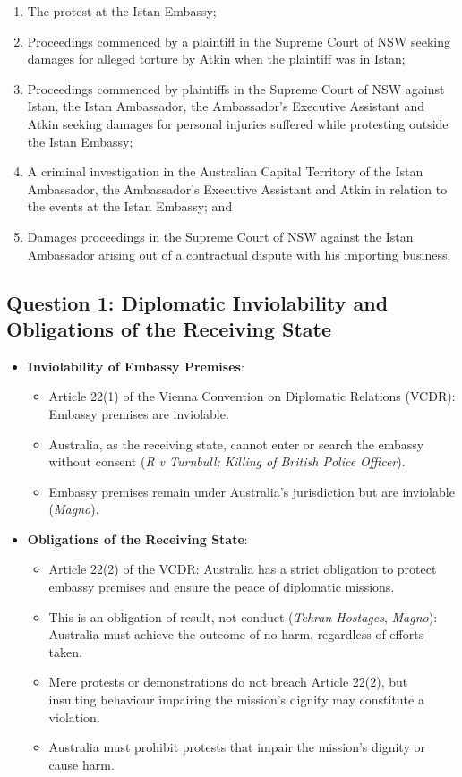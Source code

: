 \begin{tutorialquestion}
    \begin{enumerate}
        \item The protest at the Istan Embassy;
        \item Proceedings commenced by a plaintiff in the Supreme Court of NSW seeking damages for alleged torture by Atkin when the plaintiff was in Istan;
        \item Proceedings commenced by plaintiffs in the Supreme Court of NSW against Istan, the Istan Ambassador, the Ambassador’s Executive Assistant and Atkin seeking damages for personal injuries suffered while protesting outside the Istan Embassy;
        \item A criminal investigation in the Australian Capital Territory of the Istan Ambassador, the Ambassador's Executive Assistant and Atkin in relation to the events at the Istan Embassy; and
        \item Damages proceedings in the Supreme Court of NSW against the Istan Ambassador arising out of a contractual dispute with his importing business.
    \end{enumerate}
\end{tutorialquestion}

\subsection{Question 1: Diplomatic Inviolability and Obligations of the Receiving State}
\begin{itemize}
    \item \textbf{Inviolability of Embassy Premises}:
    \begin{itemize}
        \item Article 22(1) of the Vienna Convention on Diplomatic Relations (VCDR): Embassy premises are inviolable.
        \item Australia, as the receiving state, cannot enter or search the embassy without consent (\textit{R v Turnbull; Killing of British Police Officer}).
        \item Embassy premises remain under Australia’s jurisdiction but are inviolable (\textit{Magno}).
    \end{itemize}
    \item \textbf{Obligations of the Receiving State}:
    \begin{itemize}
        \item Article 22(2) of the VCDR: Australia has a strict obligation to protect embassy premises and ensure the peace of diplomatic missions.
        \item This is an obligation of result, not conduct (\textit{Tehran Hostages}, \textit{Magno}): Australia must achieve the outcome of no harm, regardless of efforts taken.
        \item Mere protests or demonstrations do not breach Article 22(2), but insulting behaviour impairing the mission’s dignity may constitute a violation.
        \item Australia must prohibit protests that impair the mission’s dignity or cause harm.
    \end{itemize}
\end{itemize}

